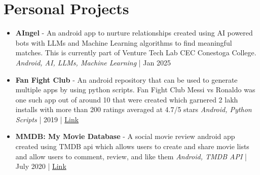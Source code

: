 \documentclass[11pt,a4paper]{article}
\begin{document}
\section{Personal Projects}
\begin{itemize}[leftmargin=0.15in, label={}]
    \item \textbf{AIngel} - An android app to nurture relationships created using AI powered bots with LLMs and Machine Learning algorithms to find meaningful matches. This is currently part of Venture Tech Lab CEC Conestoga College.
          \textit{Android, AI, LLMs, Machine Learning} | Jan 2025

    \item \textbf{Fan Fight Club} - An android repository that can be used to generate multiple apps by using python scripts. Fan Fight Club Messi vs Ronaldo was one such app out of around 10 that were created which garnered 2 lakh installs with more than 200 ratings averaged at 4.7/5 stars
          \textit{Android, Python Scripts} | 2019 | \href{https://bitbucket.org/nikhilshankarcs/fanfightclub}{Link}

    \item \textbf{MMDB: My Movie Database} - A social movie review android app created using TMDB api which allows users to create and share movie lists and allow users to comment, review, and like them
          \textit{Android, TMDB API} | July 2020 | \href{https://bitbucket.org/nikhilshankarcs/mmdb}{Link}


\end{itemize}
\end{document}
